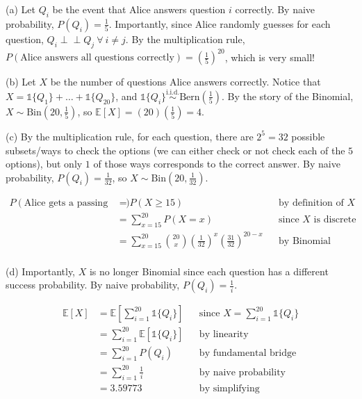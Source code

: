 \documentclass[12pt,oneside]{article}
\newcommand{\indep}{\perp\!\!\!\perp}
\newcommand{\E}{\mathbb{E}}
\newcommand{\Bern}{\text{Bern}}
\newcommand{\Bin}{\text{Bin}}
\newcommand{\simiid}{\overset{\text{i.i.d.}}{\sim}}
\newcommand{\indic}{\mathds{1}}
\theoremstyle{definition}
\theoremstyle{remark}
\begin{document}
\begin{solutionbox}
(a) Let $Q_i$ be the event that Alice answers question $i$ correctly. By naive probability, $P(Q_i) = \frac{1}{5}$. Importantly, since Alice randomly guesses for each question, $Q_i \indep Q_j \ \forall \ i \neq j$. By the multiplication rule, $P(\text{Alice answers all questions correctly}) = \left( \frac{1}{5} \right)^{20}$, which is very small!

(b) Let $X$ be the number of questions Alice answers correctly. Notice that $X = \indic\{Q_{1}\} + \ldots + \indic\{Q_{20}\}$, and $\indic\{Q_{i}\} \simiid \Bern(\frac{1}{5})$. By the story of the Binomial, $X \sim \Bin(20, \frac{1}{5})$, so $\E[X] = (20)(\frac{1}{5}) = 4$.

(c) By the multiplication rule, for each question, there are $2^5 = 32$ possible subsets/ways to check the options (we can either check or not check each of the $5$ options), but only $1$ of those ways corresponds to the correct answer. By naive probability, $P(Q_i) = \frac{1}{32}$, so $X \sim \Bin(20, \frac{1}{32})$.

\[
\begin{aligned}
P(\text{Alice gets a passing grade}) &= P(X \geq 15) && \text{by definition of $X$} \\
&= \sum_{x = 15}^{20} P(X = x) && \text{since $X$ is discrete} \\
&= \sum_{x = 15}^{20} \binom{20}{x} \left( \frac{1}{32} \right)^x \left( \frac{31}{32} \right)^{20 - x} && \text{by Binomial PMF} \\
\end{aligned}
\]

(d) Importantly, $X$ is no longer Binomial since each question has a different success probability. By naive probability, $P(Q_i) = \frac{1}{i}$.

\[
\begin{aligned}
\E[X] &= \E \left[ \sum_{i = 1}^{20} \indic\{Q_i\} \right] && \text{since $X = \sum_{i = 1}^{20} \indic\{Q_i\}$} \\
&= \sum_{i = 1}^{20} \E[\indic\{Q_i\}] && \text{by linearity} \\
&= \sum_{i = 1}^{20} P(Q_i) && \text{by fundamental bridge} \\
&= \sum_{i = 1}^{20} \frac{1}{i} && \text{by naive probability} \\
&= 3.59773 && \text{by simplifying}
\end{aligned}
\]
\end{solutionbox}
\end{document}
